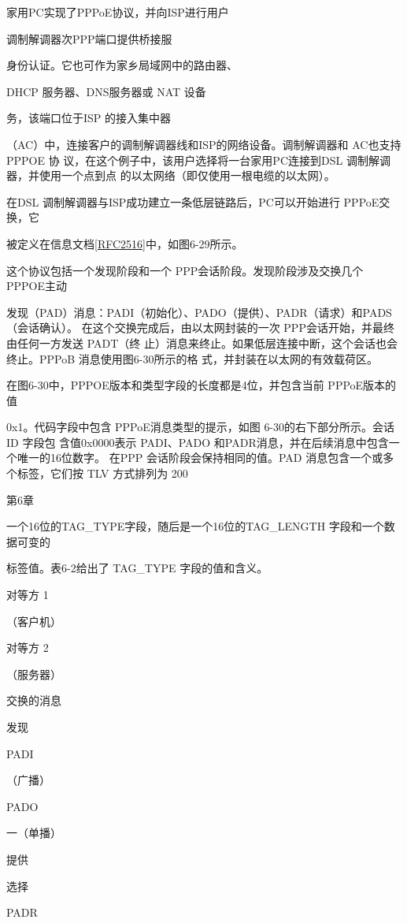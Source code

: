 家用PC实现了PPPoE协议，并向ISP进行用户

调制解调器次PPP端口提供桥接服

身份认证。它也可作为家乡局域网中的路由器、

DHCP 服务器、DNS服务器或 NAT 设备

务，该端口位于ISP 的接入集中器

（AC）中，连接客户的调制解调器线和ISP的网络设备。调制解调器和 AC也支持PPPOE 协
议，在这个例子中，该用户选择将一台家用PC连接到DSL 调制解调器，并使用一个点到点
的以太网络（即仅使用一根电缆的以太网）。

在DSL 调制解调器与ISP成功建立一条低层链路后，PC可以开始进行 PPPoE交换，它

被定义在信息文档\href{https://www.rfc-editor.org/rfc/rfc2516}{\href{https://www.rfc-editor.org/rfc/rfc2516}{[RFC2516]}}中，如图6-29所示。

这个协议包括一个发现阶段和一个 PPP会话阶段。发现阶段涉及交换几个 PPPOE主动

发现（PAD）消息：PADI（初始化）、PADO（提供）、PADR（请求）和PADS（会话确认）。
在这个交换完成后，由以太网封装的一次 PPP会话开始，并最终由任何一方发送 PADT（终
止）消息来终止。如果低层连接中断，这个会话也会终止。PPPoB 消息使用图6-30所示的格
式，并封装在以太网的有效载荷区。

在图6-30中，PPPOE版本和类型字段的长度都是4位，并包含当前 PPPoE版本的值

0x1。代码字段中包含 PPPoE消息类型的提示，如图 6-30的右下部分所示。会话ID 字段包
含值0x0000表示 PADI、PADO 和PADR消息，并在后续消息中包含一个唯一的16位数字。
在PPP 会话阶段会保持相同的值。PAD 消息包含一个或多个标签，它们按 TLV 方式排列为
200

第6章

一个16位的TAG\_TYPE字段，随后是一个16位的TAG\_LENGTH 字段和一个数据可变的

标签值。表6-2给出了 TAG\_TYPE 字段的值和含义。

对等方 1

（客户机）

对等方 2

（服务器）

交换的消息

发现

PADI

（广播）

PADO

一（单播）

提供

选择

PADR

